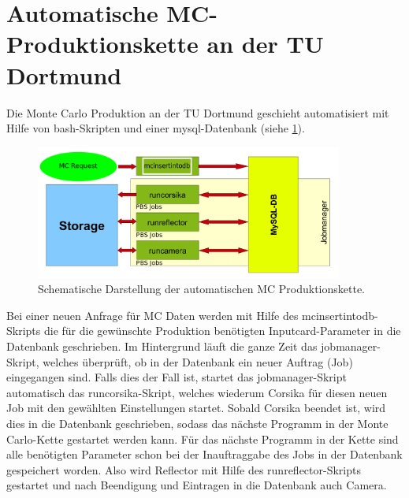




\section{Automatische MC-Produktionskette an der TU Dortmund}
\label{sec:Automatische MC-Produktion}

Die Monte Carlo Produktion an der TU Dortmund geschieht automatisiert mit Hilfe von bash-Skripten und einer mysql-Datenbank (siehe \ref{Jobmanager}).

\begin{figure}
    \centering
    \includegraphics[width=0.9\textwidth]{./Plots/03_MonteCarlos/Jobmanager.png}
    \caption{Schematische Darstellung der automatischen MC Produktionskette.}
    \label{Jobmanager}
\end{figure}


Bei einer neuen Anfrage für MC Daten werden mit Hilfe des mcinsertintodb-Skripts die für die gewünschte Produktion benötigten Inputcard-Parameter in die Datenbank geschrieben.
Im Hintergrund läuft die ganze Zeit das jobmanager-Skript, welches überprüft, ob in der Datenbank ein neuer Auftrag (Job) eingegangen sind.
Falls dies der Fall ist, startet das jobmanager-Skript automatisch das runcorsika-Skript, welches wiederum Corsika für diesen neuen Job mit den gewählten Einstellungen startet.
Sobald Corsika beendet ist, wird dies in die Datenbank geschrieben, sodass das nächste Programm in der Monte Carlo-Kette gestartet werden kann.
Für das nächste Programm in der Kette sind alle benötigten Parameter schon bei der Inauftraggabe des Jobs in der Datenbank gespeichert worden.
Also wird Reflector mit Hilfe des runreflector-Skripts gestartet und nach Beendigung und Eintragen in die Datenbank auch Camera.

